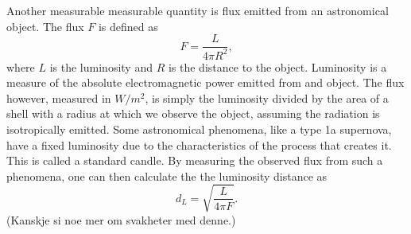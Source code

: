 Another measurable measurable quantity is flux emitted from an astronomical object.
The flux $F$ is defined as
\begin{equation}
    F = \frac{L}{4\pi R^2},
\end{equation}
where $L$ is the luminosity and $R$ is the distance to the object. Luminosity is a measure
of the absolute electromagnetic power emitted from and object. The flux however, measured in $W/m^2$, is simply the luminosity
divided by the area of a shell with a radius at which we observe the object, assuming the radiation is isotropically emitted. Some astronomical phenomena, like a type 1a supernova, have a fixed luminosity
due to the characteristics of the process that creates it. This is called a standard candle. By measuring the observed flux from such a phenomena, one can then
calculate the the luminosity distance as 
\begin{equation}
    d_L = \sqrt{\frac{L}{4\pi F}}.
\end{equation}
(Kanskje si noe mer om svakheter med denne.)


